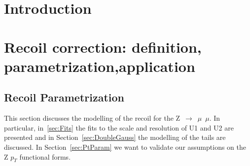 \documentclass[41pt,a4paper,oneside]{report}
\begin{document}

\begin{titlepage}

\end{titlepage}
\author{Mariarosaria D'Alfonso}

\maketitle
\tableofcontents 



\chapter{Introduction}



\chapter{Recoil correction: definition, parametrization,application}



\newpage

\section{Recoil Parametrization}

\label{sec:ParamRecoil}
This section discusses the modelling of the recoil for the Z~$\rightarrow$~$\mu$~$\mu$. 
In particular, in~\ref{sec:Fits} the fits to the scale and resolution of U1 and U2 are presented and in Section~\ref{sec:DoubleGauss} the modelling of the tails are discussed.
In Section~\ref{sec:PtParam} we want to validate our assumptions on the Z $p_{T}$ functional forms.
\end{document}
